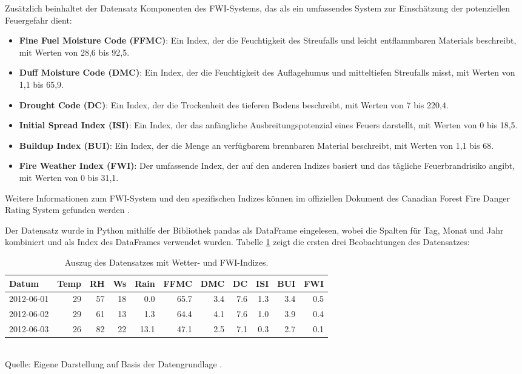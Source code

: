 Zusätzlich beinhaltet der Datensatz Komponenten des FWI-Systems, das als ein umfassendes System zur Einschätzung der potenziellen 
Feuergefahr dient:

\begin{itemize}
    \item \textbf{Fine Fuel Moisture Code (FFMC)}: Ein Index, der die Feuchtigkeit des Streufalls und leicht entflammbaren Materials beschreibt, mit Werten von 28,6 bis 92,5.
    \item \textbf{Duff Moisture Code (DMC)}: Ein Index, der die Feuchtigkeit des Auflagehumus und mitteltiefen Streufalls misst, mit Werten von 1,1 bis 65,9.
    \item \textbf{Drought Code (DC)}: Ein Index, der die Trockenheit des tieferen Bodens beschreibt, mit Werten von 7 bis 220,4.
    \item \textbf{Initial Spread Index (ISI)}: Ein Index, der das anfängliche Ausbreitungspotenzial eines Feuers darstellt, mit Werten von 0 bis 18,5.
    \item \textbf{Buildup Index (BUI)}: Ein Index, der die Menge an verfügbarem brennbaren Material beschreibt, mit Werten von 1,1 bis 68.
    \item \textbf{Fire Weather Index (FWI)}: Der umfassende Index, der auf den anderen Indizes basiert und das tägliche Feuerbrandrisiko angibt, mit Werten von 0 bis 31,1.
\end{itemize}

Weitere Informationen zum FWI-System und den spezifischen Indizes können im offiziellen Dokument des Canadian Forest Fire Danger 
Rating System gefunden werden \cite{Van_Wagner_1987}.

Der Datensatz wurde in Python mithilfe der Bibliothek \textsf{pandas} als DataFrame eingelesen, 
wobei die Spalten für Tag, Monat und Jahr kombiniert und als Index des DataFrames verwendet wurden. Tabelle \ref{tab:df-head}
zeigt die ersten drei Beobachtungen des Datensatzes:

\begin{table}[h]
    \caption{Auszug des Datensatzes mit Wetter- und FWI-Indizes.}
    \footnotesize
    \begin{tabularx}{\textwidth}{lrrrrrrrrrr}
    \toprule
    Datum       & Temp & RH & Ws & Rain & FFMC & DMC & DC  & ISI & BUI & FWI \\
    \midrule
    2012-06-01  & 29   & 57 & 18 & 0.0  & 65.7 & 3.4 & 7.6 & 1.3 & 3.4 & 0.5 \\
    2012-06-02  & 29   & 61 & 13 & 1.3  & 64.4 & 4.1 & 7.6 & 1.0 & 3.9 & 0.4 \\
    2012-06-03  & 26   & 82 & 22 & 13.1 & 47.1 & 2.5 & 7.1 & 0.3 & 2.7 & 0.1 \\
    \bottomrule
    \end{tabularx}
    \label{tab:df-head}
    \normalsize\\
    Quelle: Eigene Darstellung auf Basis der Datengrundlage \cite{misc_algerian_forest_fires_dataset___547}.
\end{table}

